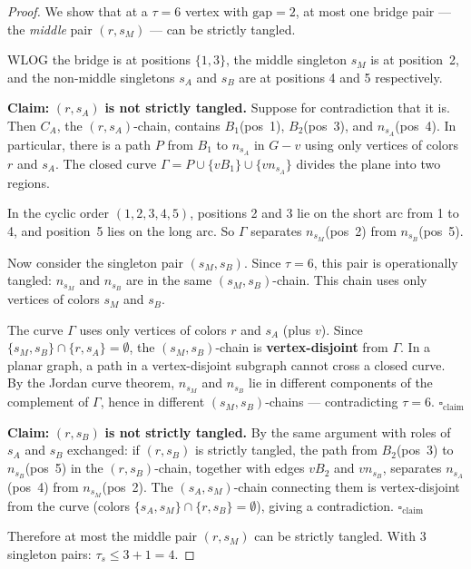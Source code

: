 \documentclass[11pt]{article}
\theoremstyle{remark}
\begin{document}
\begin{proof}
We show that at a $\tau = 6$ vertex with $\mathrm{gap} = 2$, at most one bridge pair --- the \emph{middle} pair $(r, s_M)$ --- can be strictly tangled.

WLOG the bridge is at positions $\{1, 3\}$, the middle singleton $s_M$ is at position~2, and the non-middle singletons $s_A$ and $s_B$ are at positions 4 and 5 respectively.

\medskip
\noindent\textbf{Claim:} $(r, s_A)$ \textbf{is not strictly tangled.} Suppose for contradiction that it is. Then $C_A$, the $(r, s_A)$-chain, contains $B_1$(pos~1), $B_2$(pos~3), and $n_{s_A}$(pos~4). In particular, there is a path $P$ from $B_1$ to $n_{s_A}$ in $G - v$ using only vertices of colors $r$ and $s_A$. The closed curve $\Gamma = P \cup \{vB_1\} \cup \{vn_{s_A}\}$ divides the plane into two regions.

In the cyclic order $(1, 2, 3, 4, 5)$, positions 2 and 3 lie on the short arc from 1 to 4, and position~5 lies on the long arc. So $\Gamma$ separates $n_{s_M}$(pos~2) from $n_{s_B}$(pos~5).

Now consider the singleton pair $(s_M, s_B)$. Since $\tau = 6$, this pair is operationally tangled: $n_{s_M}$ and $n_{s_B}$ are in the same $(s_M, s_B)$-chain. This chain uses only vertices of colors $s_M$ and $s_B$.

The curve $\Gamma$ uses only vertices of colors $r$ and $s_A$ (plus $v$). Since $\{s_M, s_B\} \cap \{r, s_A\} = \emptyset$, the $(s_M, s_B)$-chain is \textbf{vertex-disjoint} from $\Gamma$. In a planar graph, a path in a vertex-disjoint subgraph cannot cross a closed curve. By the Jordan curve theorem, $n_{s_M}$ and $n_{s_B}$ lie in different components of the complement of $\Gamma$, hence in different $(s_M, s_B)$-chains --- contradicting $\tau = 6$. \hfill$\square_{\text{claim}}$

\medskip
\noindent\textbf{Claim:} $(r, s_B)$ \textbf{is not strictly tangled.} By the same argument with roles of $s_A$ and $s_B$ exchanged: if $(r, s_B)$ is strictly tangled, the path from $B_2$(pos~3) to $n_{s_B}$(pos~5) in the $(r, s_B)$-chain, together with edges $vB_2$ and $vn_{s_B}$, separates $n_{s_A}$(pos~4) from $n_{s_M}$(pos~2). The $(s_A, s_M)$-chain connecting them is vertex-disjoint from the curve (colors $\{s_A, s_M\} \cap \{r, s_B\} = \emptyset$), giving a contradiction. \hfill$\square_{\text{claim}}$

\medskip
Therefore at most the middle pair $(r, s_M)$ can be strictly tangled. With 3 singleton pairs: $\tau_s \leq 3 + 1 = 4$.
\end{proof}
\end{document}
